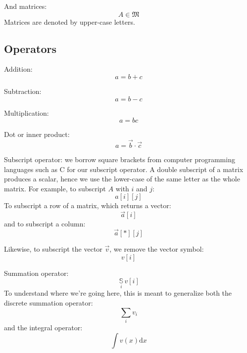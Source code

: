 \documentclass{article}
\newcommand{\matrixclass}{\mathfrak{M}}
\newcommand{\inner}{\cdot}
\newcommand{\summation}[1]{\underset{#1}{\,\mathbb{S}\,}}
\begin{document}
And matrices:
\begin{equation}
	A \in \matrixclass
	\label{matrixmembership}
\end{equation}
Matrices are denoted by upper-case letters.

\subsection{Operators}

Addition:
\begin{equation}
	a = b+c
\end{equation}

Subtraction:
\begin{equation}
	a = b - c
\end{equation}

Multiplication:
\begin{equation}
	a = b c
\end{equation}

Dot or inner product:
\begin{equation}
	a = \vec b \inner \vec c
\end{equation}

Subscript operator: we borrow square brackets from computer programming
languages such as C for our subscript operator.
A double subscript of a matrix produces a scalar, hence we use the lower-case
of the same letter as the whole matrix.
For example, to subscript $A$ with $i$ and $j$:
\begin{equation}
	a[i][j]
\end{equation}
To subscript a row of a matrix, which returns a vector:
\begin{equation}
	\vec a[i]
\end{equation}
and to subscript a column:
\begin{equation}
	\vec a[*][j]
\end{equation}

Likewise, to subscript the vector $\vec v$, we remove the vector symbol:
\begin{equation}
	v[i]
\end{equation}

Summation operator:
\begin{equation}
	\summation{i} v[i]
\end{equation}
To understand where we're going here, this is meant to generalize both the 
discrete summation operator:
\begin{equation}
	\sum_i v_i
\end{equation}
and the integral operator:
\begin{equation}
	\int v(x) \mathrm d x
\end{equation}
\end{document}
